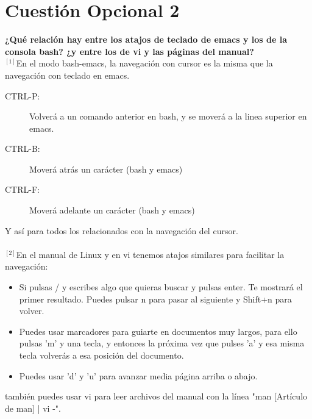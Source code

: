 \documentclass[a4paper, 11pt]{article} %
\begin{document}
\section{Cuestión Opcional 2}
\textbf{¿Qué relación hay entre los atajos de teclado de emacs y los de la consola bash? ¿y entre los de vi y las páginas del manual?}\\

$^{[1]}$En el modo bash-emacs, la navegación con cursor es la misma que la navegación con teclado en emacs.
\begin{description}
\item [CTRL-P:] Volverá a un comando anterior en bash, y se moverá a la linea superior en emacs.
\item [CTRL-B:] Moverá atrás un carácter (bash y emacs)
\item [CTRL-F:] Moverá adelante un carácter (bash y emacs)
\end{description}
Y así para todos los relacionados con la navegación del cursor.\\ \\
$^{[2]}$En el manual de Linux y en vi tenemos atajos similares para facilitar la navegación:
\begin{itemize}
\item Si pulsas / y escribes algo que quieras buscar y pulsas enter. Te mostrará el primer resultado. Puedes pulsar n para pasar al siguiente y Shift+n para volver.
\item Puedes usar marcadores para guiarte en documentos muy largos, para ello pulsas 'm' y una tecla, y entonces la próxima vez que pulses 'a' y esa misma tecla volverás a esa posición del documento.
\item Puedes usar 'd' y 'u' para avanzar media página arriba o abajo.
\end{itemize}
también puedes usar vi para leer archivos del manual con la línea "man [Artículo de man] | vi -".
\end{document}
